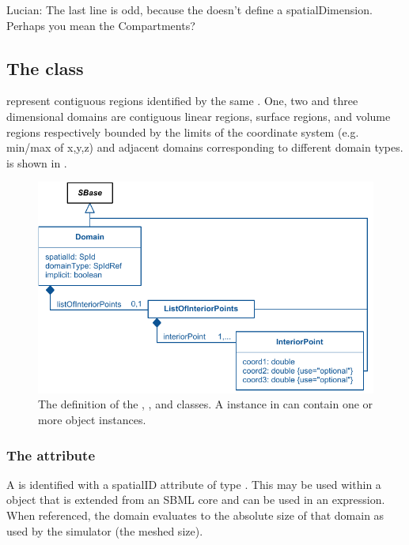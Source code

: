 {\color{red} Lucian: \notice The last line is odd, because the \Domain doesn't define a spatialDimension.  Perhaps you mean the Compartments?}


\subsection{The  class}
\label{Domain-class}
\label{ListOfInteriorPoints-class}
\Domains represent contiguous regions identified by the same \DomainType.  One, two and three dimensional domains are contiguous linear regions, surface regions, and volume regions respectively bounded by the limits of the coordinate system (e.g. min/max of x,y,z) and adjacent domains corresponding to different domain types.  \Domain is shown in .
 
\begin{figure}[ht]
  \includegraphics{figs/Domain-uml}
  \caption{The definition of the \Domain, \ListOfInteriorPoints, and \InteriorPoint classes.  A \ListOfDomains instance in \Geometry can contain one or more \Domain object instances.}
  \label{Domain-uml}
  \label{InteriorPoint-uml}
  \label{ListOfInteriorPoints-uml}
\end{figure}

\subsubsection{The  attribute}
A \Domain is identified with a spatialID attribute of type .  This  may be used within a \SpatialSymbolReference object that is extended from an SBML core \Parameter and can be used in an expression.  When referenced, the domain evaluates to the absolute size of that domain as used by the simulator (the meshed size).

